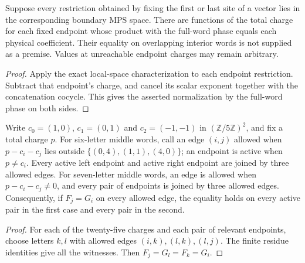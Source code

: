 \begin{lemma}
    \label{lem:short_volume_weyl_overlap_charge_coefficients}
    \leanok
    Suppose every restriction obtained by fixing the first or last site
    of a vector lies in the corresponding boundary MPS space.
    There are functions of the total charge for each fixed endpoint
    whose product with the full-word phase equals each physical
    coefficient. Their equality on overlapping interior words is not
    supplied as a premise. Values at unreachable endpoint charges
    may remain arbitrary.
\end{lemma}
\begin{proof}\leanok
    Apply the exact local-space characterization to each endpoint
    restriction. Subtract that endpoint's charge, and cancel its scalar
    exponent together with the concatenation cocycle. This gives
    the asserted normalization by the full-word phase on both sides.
\end{proof}

\begin{lemma}
    \label{lem:short_weyl_overlap_charge_bridges}
    \leanok
    Write $c_0=(1,0)$, $c_1=(0,1)$ and $c_2=(-1,-1)$ in
    $(\mathbb Z/5\mathbb Z)^2$, and fix a total charge $p$.
    For six-letter middle words, call an edge $(i,j)$ allowed when
    $p-c_i-c_j$ lies outside $\{(0,4),(1,1),(4,0)\}$; an endpoint is
    active when $p\ne c_i$. Every active left endpoint and active right
    endpoint are joined by three allowed edges. For seven-letter middle
    words, an edge is allowed when $p-c_i-c_j\ne0$, and every pair of
    endpoints is joined by three allowed edges.
    Consequently, if $F_j=G_i$ on every allowed edge, the equality holds
    on every active pair in the first case and every pair in the second.
\end{lemma}
\begin{proof}
    \leanok
    For each of the twenty-five charges and each pair of relevant endpoints,
    choose letters $k,l$ with allowed edges $(i,k),(l,k),(l,j)$.
    The finite residue identities give all the witnesses.
    Then $F_j=G_l=F_k=G_i$.
\end{proof}

